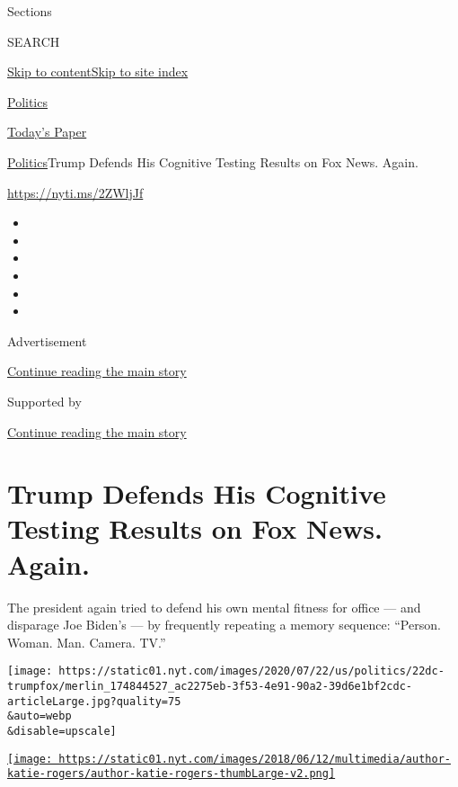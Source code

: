 Sections

SEARCH

\protect\hyperlink{site-content}{Skip to
content}\protect\hyperlink{site-index}{Skip to site index}

\href{https://www.nytimes.com/section/politics}{Politics}

\href{https://myaccount.nytimes.com/auth/login?response_type=cookie\&client_id=vi}{}

\href{https://www.nytimes.com/section/todayspaper}{Today's Paper}

\href{/section/politics}{Politics}\textbar{}Trump Defends His Cognitive
Testing Results on Fox News. Again.

\url{https://nyti.ms/2ZWljJf}

\begin{itemize}
\item
\item
\item
\item
\item
\item
\end{itemize}

Advertisement

\protect\hyperlink{after-top}{Continue reading the main story}

Supported by

\protect\hyperlink{after-sponsor}{Continue reading the main story}

\hypertarget{trump-defends-his-cognitive-testing-results-on-fox-news-again}{%
\section{Trump Defends His Cognitive Testing Results on Fox News.
Again.}\label{trump-defends-his-cognitive-testing-results-on-fox-news-again}}

The president again tried to defend his own mental fitness for office
--- and disparage Joe Biden's --- by frequently repeating a memory
sequence: ``Person. Woman. Man. Camera. TV.''

\texttt{[image: https://static01.nyt.com/images/2020/07/22/us/politics/22dc-trumpfox/merlin\_174844527\_ac2275eb-3f53-4e91-90a2-39d6e1bf2cdc-articleLarge.jpg?quality=75\\\&auto=webp\\\&disable=upscale]}

\href{https://www.nytimes.com/by/katie-rogers}{\texttt{[image: https://static01.nyt.com/images/2018/06/12/multimedia/author-katie-rogers/author-katie-rogers-thumbLarge-v2.png]}}

